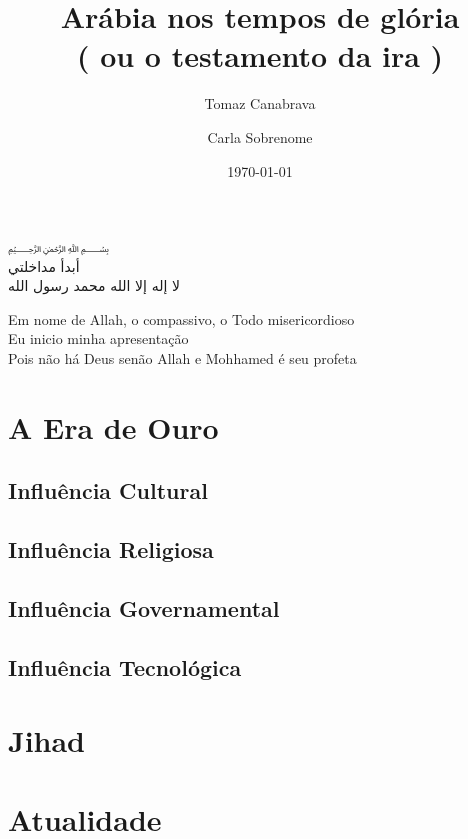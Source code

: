 \documentclass{beamer}
\title{ Arábia nos tempos de glória \\( ou o testamento da ira )}
\author{ Tomaz {Canabrava} \and Carla {Sobrenome}}
\institute{ IFSP - HTO \\ Instituto federal de São Paulo, Campus Hortolândia}
\date{\today}
\begin{document}
\begin{frame}
	\begin{center}
		\textarabic{﷽\\أبدأ مداخلتي\\ لا إله إلا الله محمد رسول الله}
	\end{center}
\end{frame}

\begin{frame}
	\begin{center}
		Em nome de Allah, o compassivo, o Todo misericordioso\\
		Eu inicio minha apresentação\\
		Pois não há Deus senão Allah e Mohhamed é seu profeta
	\end{center}
\end{frame}

\begin{frame}
 \titlepage
\end{frame}

\section{A Era de Ouro}
\subsection{ Influência Cultural }
\subsection{ Influência Religiosa }
\subsection{ Influência Governamental }
\subsection{ Influência Tecnológica }
\section{Jihad}
\section{Atualidade}
\end{document}
